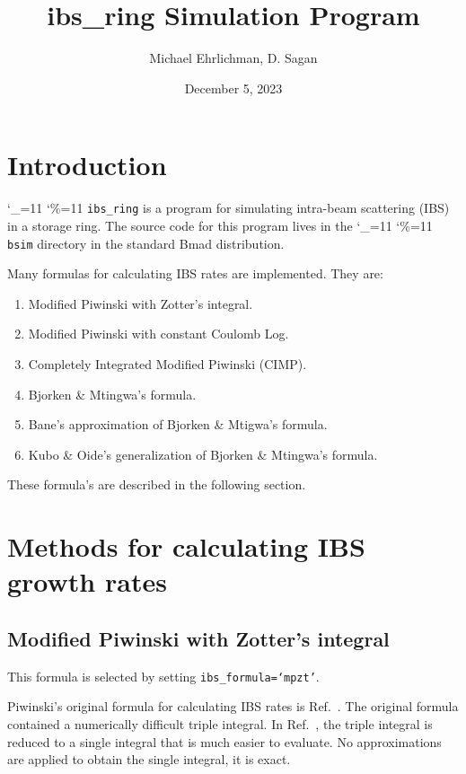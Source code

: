 \documentclass[11pt]{article}
\title{ibs_ring Simulation Program}
\author{Michael Ehrlichman, D. Sagan}
\date{December 5, 2023}
\newcommand\ttcmd{\begingroup\catcode`\_=11 \catcode`\%=11 \dottcmd}
\newcommand\dottcmd[1]{\texttt{#1}\endgroup}
\newcommand{\vn}{\ttcmd}
\begin{document}
\maketitle

\tableofcontents

\section{Introduction} 
\label{s:intro}

\vn{ibs_ring} is a program for simulating intra-beam scattering (IBS) in a storage ring.
The source code for this program lives in the \vn{bsim} directory in
the standard Bmad\cite{b:bmad} distribution.

Many formulas for calculating IBS rates are implemented.  They are:
\begin{enumerate}
\item Modified Piwinski with Zotter's integral.
\item Modified Piwinski with constant Coulomb Log.
\item Completely Integrated Modified Piwinski (CIMP).
\item Bjorken \& Mtingwa's formula.
\item Bane's approximation of Bjorken \& Mtigwa's formula.
\item Kubo \& Oide's generalization of Bjorken \& Mtingwa's formula.
\end{enumerate}
These formula's are described in the following section.

\section{Methods for calculating IBS growth rates}

\subsection{Modified Piwinski with Zotter's integral}
This formula is selected by setting {\tt ibs_formula=`mpzt'}.

Piwinski's original formula for calculating IBS rates is Ref.~\cite{b:pw}.  The
original formula contained a numerically difficult triple integral.  In
Ref.~\cite{b:zotter}, the triple integral is reduced to a single integral that is 
much easier to evaluate.  No 
approximations are applied to obtain the single integral, it is exact.
\end{document}
